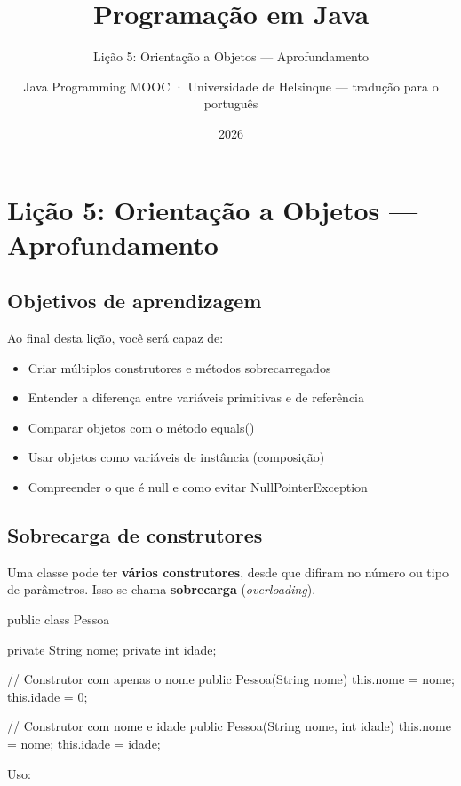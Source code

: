 \documentclass[11pt,a4paper]{article}
\title{Programação em Java}
\subtitle{Lição 5: Orientação a Objetos --- Aprofundamento}
\author{Java Programming MOOC · Universidade de Helsinque --- tradução para o português}
\date{2026}
\renewcommand{\texttt}[1]{{\color{javaCodeInline}\small\ttfamily #1}}
\begin{document}
\maketitle
{\hypersetup{linkcolor=javaDeep}\setcounter{tocdepth}{3}\tableofcontents}
\newpage

\section{Lição 5: Orientação a Objetos --- Aprofundamento}

\subsection{Objetivos de aprendizagem}

Ao final desta lição, você será capaz de:

\begin{itemize}
\item Criar múltiplos construtores e métodos sobrecarregados
\item Entender a diferença entre variáveis primitivas e de referência
\item Comparar objetos com o método \texttt{equals()}
\item Usar objetos como variáveis de instância (composição)
\item Compreender o que é \texttt{null} e como evitar \texttt{NullPointerException}
\end{itemize}

\subsection{Sobrecarga de construtores}

Uma classe pode ter \textbf{vários construtores}, desde que difiram no número ou tipo de parâmetros. Isso se chama \textbf{sobrecarga} (\textit{overloading}).

\begin{javacode}
public class Pessoa {
    private String nome;
    private int idade;

    // Construtor com apenas o nome
    public Pessoa(String nome) {
        this.nome = nome;
        this.idade = 0;
    }

    // Construtor com nome e idade
    public Pessoa(String nome, int idade) {
        this.nome = nome;
        this.idade = idade;
    }
}
\end{javacode}

Uso:
\end{document}
